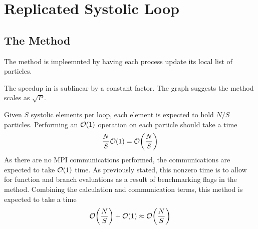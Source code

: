 \section{Replicated Systolic Loop}


\subsection{The \individualoperation{} Method}

The \individualoperation{} method is impleemnted by having each process
update its local list of particles.

%
%
\begin{figure}[!h]
    
    \caption{
        \vZeroSpeedupCaption
            {\replicatedsystolicloop{}}
            {\individualoperation{}}
    }
    \label{fig:v1_replicated_systolic_loop_individual_operation_speedups}
\end{figure}


\vZeroSpeedupExplanation
    {}
    {\replicatedsystolicloop{}}
    {\individualoperation{}}

%

The speedup in
is sublinear by a constant factor.
%
The graph suggests the method scales as $\sqrt{P}$.

%

Given $S$ systolic elements per loop, each element is expected to
hold $N/S$ particles.
%
Performing an $\mathcal{O}{\left({ 1 }\right)}$ operation on each particle should take a time
\begin{equation}
    \frac{N}{S}\mathcal{O}{\left({ 1 }\right)} = \mathcal{O}{\left({ \frac{N}{S} }\right)}
\end{equation}
%
As there are no MPI communications performed, the communications are expected
to take $\mathcal{O}{\left({ 1 }\right)}$ time.
%
As previously stated, this nonzero time is to allow for function
and branch evaluations as a result of benchmarking flags in the method.
%
Combining the calculation and communication terms, this method
is expected to take a time
\begin{equation}
    \mathcal{O}{\left({ \frac{N}{S} }\right)} + \mathcal{O}{\left({ 1 }\right)} \approx{} \mathcal{O}{\left({ \frac{N}{S} }\right)}
\end{equation}

